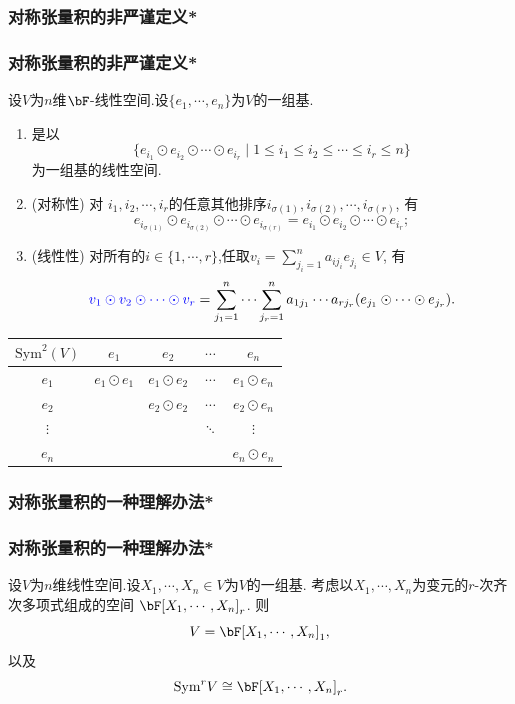 \subsubsection{对称张量积的非严谨定义*}
\begin{frame}\frametitle{对称张量积的非严谨定义*}
\begin{proposition}[对称张量积]
设$V$为$n$维$\bF$-线性空间.设$\{e_{1},\cdots,e_n\}$为$V$的一组基.
\begin{enumerate}
\item {} 是以
\[ \{e_{i_1}\odot e_{i_2} \odot \cdots \odot e_{i_r} \mid 1\leq i_1\leq i_2\leq \cdots \leq i_r\leq n\}\]
为一组基的线性空间.
\item (对称性) 对 $i_1,i_2,\cdots,i_r$的任意其他排序$i_{\sigma(1)},i_{\sigma(2)},\cdots,i_{\sigma(r)}$, 有
\[e_{i_{\sigma(1)}}\odot e_{i_{\sigma(2)}} \odot\cdots\odot e_{i_{\sigma(r)}}=e_{i_1}\odot e_{i_2} \odot \cdots \odot e_{i_r};\]
\item (线性性) 对所有的$i\in \{1,\cdots,r\}$,任取$v_i=\sum_{j_i=1}^{n} a_{ij_i} e_{j_i}\in V$, 有
\[\blue{v_1\odot v_2\odot \cdots \odot v_r} = \sum_{j_1=1}^{n} \cdots  \sum_{j_r=1}^{n} a_{1j_1} \cdots a_{rj_r} (e_{j_1}\odot \cdots\odot e_{j_r}).\]
\end{enumerate}
\end{proposition}
\pp
\begin{center}
\begin{tabular}{c|cccc}
 $\mathrm{Sym}^2(V)$& $e_1$  & $e_2$ & $\cdots$ & $e_n$ \\ \hline
 $e_1$ & $e_1\odot e_1$ &$e_1\odot e_2$  & $\cdots$ & $e_1\odot e_n$ \\
 $e_2$ &  &$e_2\odot e_2$  & $\cdots$ & $e_2\odot e_n$ \\
 $\vdots$ &   &   &  $\ddots$ &  $\vdots$ \\
$e_n$ &  &  & & $e_n\odot e_n$  \\
\end{tabular}
\end{center}
\end{frame}





\subsubsection{对称张量积的一种理解办法*}
\begin{frame}\frametitle{对称张量积的一种理解办法*}
\begin{proposition}
设$V$为$n$维线性空间.设$X_1,\cdots,X_n\in V$为$V$的一组基. 考虑以$X_1,\cdots,X_n$为变元的$r$-次齐次多项式组成的空间 $\bF[X_1,\cdots,X_n]_r$. 则
\[V = \bF[X_1,\cdots,X_n]_1,\]
以及
\[\mathrm{Sym}^rV \cong \bF[X_1,\cdots,X_n]_r.\]
\end{proposition}

\end{frame}





